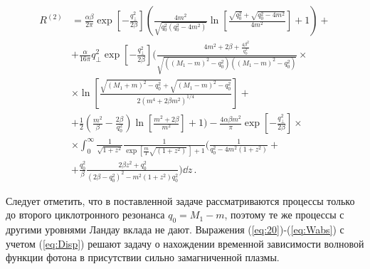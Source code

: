 \begin{equation}\begin{aligned}
	R^{(2)}&= \frac{\alpha\beta}{2\pi}\exp\left[-\frac{q_\perp^2}{2\beta}\right]\left(\frac{4m^2}{\sqrt{q_0^2(q_0^2-4m^2)}}\ln\left[\frac{\sqrt{q_0^2}+\sqrt{q_0^2-4m^2}}{4m^2}\right]+1\right)+ 
	\\
	&+\frac{\alpha}{16\pi}q^2_\perp \exp\left[-\frac{q_\perp^2}{2\beta}\right] \bigg( \frac{4m^2+2\beta+\frac{4\beta^2}{ q_0^2}}{\sqrt{((M_1-m)^2-q^2_0)((M_1-m)^2-q^2_0)}}
	\times
	\\
	&\times
	\ln\left[\frac{\sqrt{(M_1+m)^2-q_0^2}+\sqrt{(M_1-m)^2-q_0^2}}{2(m^4+2\beta m^2)^{1/4}}\right]+
	\\
	&+\frac{1}{2}\left(\frac{m^2}{\beta}-\frac{2\beta}{q_0^2}\right)\ln\left[\frac{m^2+2\beta}{m^2}\right]+1\bigg)- \frac{4\alpha\beta m^2}{\pi}\exp\left[-\frac{q_\perp^2}{2\beta}\right]\times
	\\
	&\times
	\int_{0}^{\infty}\frac{1}{\sqrt{1+z^2}}\frac{1}{\exp[\frac{m}{T}\sqrt{(1+z^2)}\,]+1}\bigg(\frac{1}{q_0^2-4m^2(1+z^2)}+
	\\
	&+\frac{q_0^2}{\beta}\frac{2\beta z^2 + q_0^2}{(2\beta - q_0^2)^2-m^2(1+z^2)q_0^2}\bigg)\dd z\, .
\end{aligned}\end{equation}

Следует отметить, что в поставленной задаче рассматриваются процессы только до второго циклотронного резонанса $q_0=M_1-m$, поэтому те же процессы с другими уровнями Ландау вклада не дают.
Выражения (\ref{eq:20})-(\ref{eq:Wabs}) с учетом (\ref{eq:Disp}) решают задачу 
о нахождении временной зависимости волновой функции фотона  в присутствии сильно 
замагниченной плазмы. 

